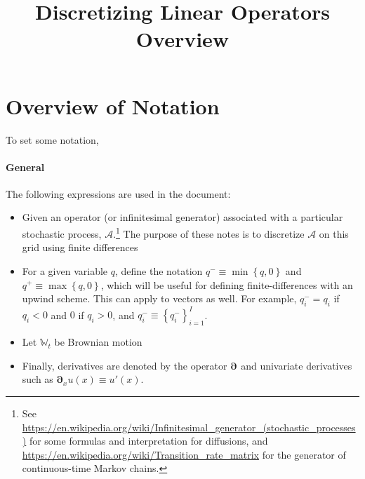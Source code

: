 \documentclass[11pt]{article}
\newcommand{\set}[1]{\ensuremath{\left\{{#1}\right\}}}
\newcommand{\D}[1][]{\ensuremath{\boldsymbol{\partial}_{#1}}}
\newcommand{\A}{\ensuremath{\mathcal{A}}}
\begin{document}
	\title{Discretizing Linear Operators Overview}
	\author{}
	\date{}
	\maketitle
	\section{Overview of Notation}
	To set some notation,
	\paragraph{General}
	
	The following expressions are used in the document:
	\begin{itemize}
		\item Given an operator (or infinitesimal generator) associated with a particular stochastic process, $\A$.\footnote{See \url{https://en.wikipedia.org/wiki/Infinitesimal_generator_(stochastic_processes)} for some formulas and interpretation for diffusions, and \url{https://en.wikipedia.org/wiki/Transition_rate_matrix} for the generator of continuous-time Markov chains.}  The purpose of these notes is to discretize $\A$ on this grid using finite differences
		\item For a given variable $q$, define the notation $q^{-} \equiv \min\set{q,0}$ and $q^{+} \equiv \max\set{q,0}$, which will be useful for defining finite-differences with an upwind scheme.  This can apply to vectors as well. For example, $q_i^{-} = q_i$ if $q_i < 0$ and $0$ if $q_i > 0$, and $q_i^{-} \equiv \set{q^{-}_i}_{i=1}^{I}$.
		\item Let $\mathbb{W}_t$ be Brownian motion
		\item Finally, derivatives are denoted by the operator $\D$ and univariate derivatives such as $\D[x]u(x) \equiv u'(x)$.
	\end{itemize}
	
\end{document}
